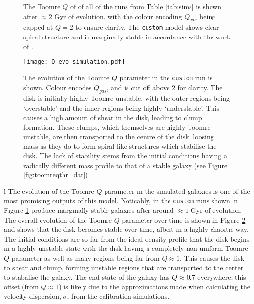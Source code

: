 \begin{figure}[!ht]
    \leavevmode\rlap{\usebox{\graphicsbox}}%
    \begin{minipage}[b]{0.63\wd\graphicsbox}%
        \caption{The Toomre $Q$ of of all of the runs from Table \ref{tab:sims} is shown after $\approx 2$ Gyr of evolution, with the colour encoding $Q_{gas}$ being capped at $Q=2$ to ensure clarity. The {\tt custom} model shows clear spiral structure and is marginally stable in accordance with the work of \citet{hopkins_stellar_2012}.}
        \label{fig:toomqsimbigfig}
    \end{minipage}\hspace*{0.33\wd\graphicsbox}%
\end{figure}

\begin{figure}[!ht]
    \texttt{[image: Q\_evo\_simulation.pdf]}
    \caption{The evolution of the Toomre $Q$ parameter in the {\tt custom} run is shown. Colour encodes $Q_{gas}$, and is cut off above $2$ for clarity. The disk is initially highly Toomre-unstable, with the outer regions being `overstable' and the inner regions being highly `understable'. This causes a high amount of shear in the disk, leading to clump formation. These clumps, which themselves are highly Toomre unstable, are then transported to the centre of the disk, loosing mass as they do to form spiral-like structures which stabilise the disk. The lack of stability stems from the initial conditions having a radically different mass profile to that of a stable galaxy (see Figure \ref{fig:toomreqthr_dat})}
    \label{fig:toomqsimsmallfig}
\end{figure}
l
The evolution of the Toomre $Q$ parameter in the simulated galaxies is one of the most promising outputs of this model.
Noticably, in the {\tt custom} runs shown in Figure \ref{fig:toomqsimbigfig} produce marginally stable galaxies after around $\approx 1$ Gyr of evolution.
The overall evolution of the Toomre $Q$ parameter over time is shown in Figure \ref{fig:toomqsimsmallfig} and shows that the disk becomes stable over time, albeit in a highly chaoitic way.
The initial conditions are so far from the ideal density profile that the disk begins in a highly unstable state with the disk having a completely non-uniform Toomre $Q$ parameter as well as many regions being far from $Q \approx 1$.
This causes the disk to shear and clump, forming unstable regions that are transported to the center to stabalise the galaxy.
The end state of the galaxy has $Q \approx 0.7$ everywhere; this offset (from $Q\approx 1$) is likely due to the approximations made when calculating the velocity dispersion, $\sigma$, from the calibration simulations.

